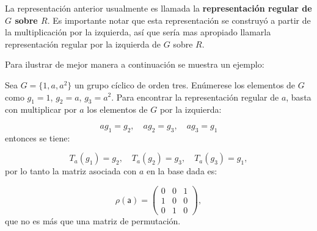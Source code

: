 La representación anterior usualmente es llamada la \textbf{representación regular de $G$ sobre $R$}. Es importante notar que esta representación se construyó a partir de la multiplicación por la izquierda, así que sería mas apropiado llamarla representación regular por la izquierda de $G$ sobre $R$.

Para ilustrar de mejor manera a continuación se muestra un ejemplo:

\begin{ejemplo}
Sea $G = \{ 1,a,a^2 \}$ un grupo cíclico de orden tres. Enúmerese los elementos de $G$ como $g_1 = 1$, $g_2 = a$, $g_3 = a^2$. Para encontrar la representación regular de $a$, basta con multiplicar por $a$ los elementos de $G$ por la izquierda:

\[  ag_1 = g_2, \quad ag_2 = g_3, \quad ag_3 = g_1 \] entonces se tiene:

\[  T_a(g_1) = g_2, \quad T_a(g_2) = g_3, \quad T_a(g_3) = g_1, \] por lo tanto la matriz asociada con $a$ en la base dada es:

\[ \mathsf{\rho(a)} =  \begin{pmatrix}
0 & 0 & 1 \\
1 & 0 & 0 \\
0 & 1 & 0
\end{pmatrix},  \] que no es más que una matriz de permutación.



\end{ejemplo}


